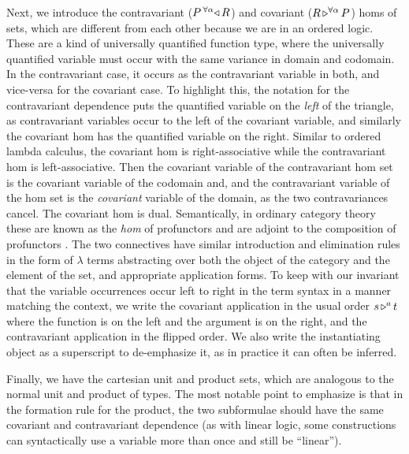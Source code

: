 \documentclass{llncs}
\begin{document}
Next, we introduce the contravariant ($\homlallXYtoZ \alpha R P$) and
covariant ($\homrallXYtoZ \alpha R P$) homs of sets, which are
different from each other because we are in an ordered logic.
%
These are a kind of universally quantified
function type, where the universally quantified variable must occur
with the same variance in domain and codomain. In the contravariant
case, it occurs as the contravariant variable in both, and vice-versa
for the covariant case.
%
To highlight this, the notation for the contravariant dependence puts
the quantified variable on the \emph{left} of the triangle, as
contravariant variables occur to the left of the covariant variable,
and similarly the covariant hom has the quantified variable on the
right.
%
Similar to ordered lambda calculus, the covariant hom is
right-associative while the contravariant hom is left-associative.
%
Then the
covariant variable of the contravariant hom set is the covariant
variable of the codomain and, and the contravariant variable of the
hom set is the \emph{covariant} variable of the domain, as the two
contravariances cancel. The covariant hom is dual.
%
Semantically, in ordinary category theory these are known as the
\emph{hom} of profunctors and are adjoint to the composition of
profunctors \cite{benabou2000distributors}.
%
The two connectives have similar introduction and elimination rules in
the form of $\lambda$ terms abstracting over both the object of the
category and the element of the set, and appropriate application
forms.
%
To keep with our invariant that the variable occurrences occur left to
right in the term syntax in a manner matching the context, we write
the covariant application in the usual order $\homrappXtoYatZ s t a$
where the function is on the left and the argument is on the right,
and the contravariant application in the flipped order.
%
We also write the instantiating object as a superscript to
de-emphasize it, as in practice it can often be inferred.

Finally, we have the cartesian unit and product sets, which are
analogous to the normal unit and product of types. The most notable
point to emphasize is that in the formation rule for the product, the
two subformulae should have the same covariant and contravariant
dependence (as with linear logic, some constructions can
syntactically use a variable more than once and still be ``linear'').  
\end{document}
